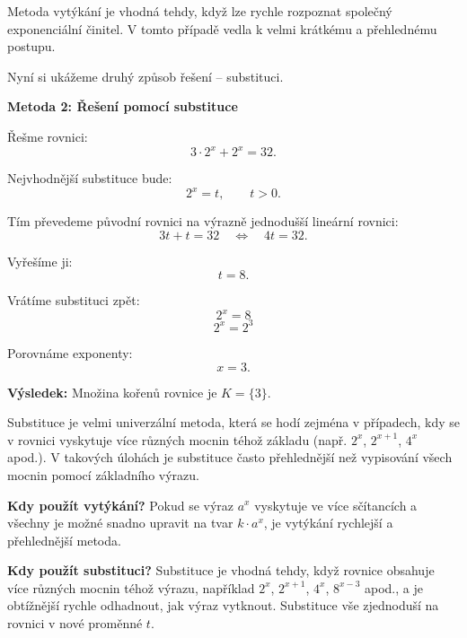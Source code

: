 \documentclass[12pt,a4paper]{article}
\begin{document}
\noindent
Metoda vytýkání je vhodná tehdy, když lze rychle rozpoznat společný exponenciální
činitel. V tomto případě vedla k velmi krátkému a přehlednému postupu.

\medskip

Nyní si ukážeme druhý způsob řešení – substituci.


\begin{examplebox}
\textbf{Metoda 2: Řešení pomocí substituce}

Řešme rovnici:
\[
    3\cdot 2^x + 2^x = 32.
\]

Nejvhodnější substituce bude:
\[
    2^x = t, \qquad t>0.
\]

Tím převedeme původní rovnici na výrazně jednodušší lineární rovnici:
\[
    3t + t = 32 \quad \Longleftrightarrow \quad 4t = 32.
\]

Vyřešíme ji:
\[
    t = 8.
\]

Vrátíme substituci zpět:
\[
    2^x = 8
\]
\[
    2^x = 2^3
\]

Porovnáme exponenty:
\[
    x = 3.
\]

\medskip
\textbf{Výsledek:}  
Množina kořenů rovnice je $K = \{3\}$.
\end{examplebox}

\noindent
Substituce je velmi univerzální metoda, která se hodí zejména v případech,
kdy se v rovnici vyskytuje více různých mocnin téhož základu (např. $2^x$, $2^{x+1}$, $4^x$ apod.).
V takových úlohách je substituce často přehlednější než vypisování všech mocnin
pomocí základního výrazu.




\begin{notebox}
\textbf{Kdy použít vytýkání?}  
Pokud se výraz $a^x$ vyskytuje ve více sčítancích a všechny je možné snadno upravit
na tvar $k \cdot a^x$, je vytýkání rychlejší a přehlednější metoda.

\medskip

\textbf{Kdy použít substituci?}  
Substituce je vhodná tehdy, když rovnice obsahuje více různých mocnin téhož výrazu,
například $2^x$, $2^{x+1}$, $4^x$, $8^{x-3}$ apod., a je obtížnější rychle odhadnout,
jak výraz vytknout. Substituce vše zjednoduší na rovnici v nové proměnné $t$.
\end{notebox}
\end{document}
